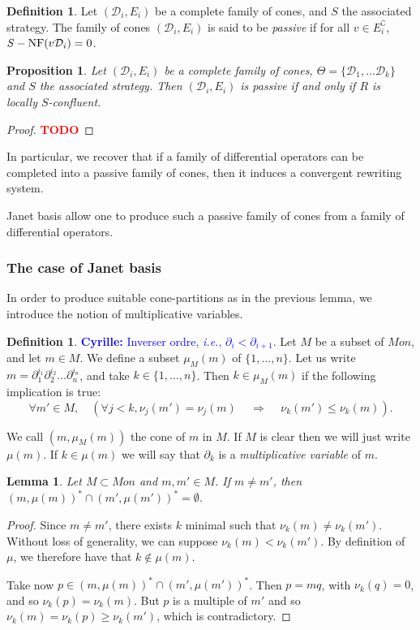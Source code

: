 \documentclass[10pt]{easychair}
\newtheorem{lemma}[theorem]{Lemma}
\newtheorem{proposition}[theorem]{Proposition}
\theoremstyle{definition}
\newtheorem{definition}[theorem]{Definition}
\newcommand\ie{\emph{i.e.}}
\newcommand\todo[1]{{\bf\textcolor{red}{#1}}}
\newcommand\fixmecc[1]{{\textcolor{blue}{{\bf Cyrille:} #1}}}
\newcommand\D{\mathcal{D}}
\DeclareMathOperator{\SNF}{{\it S}-NF}
\begin{document}
 
\begin{definition}
  Let $(\D_i,E_i)$ be a complete family of cones, and $S$ the associated strategy.
  The family of cones $(\D_i,E_i)$ is said to be \emph{passive} if for all
  $v \in E_i^\complement$, $\SNF(v\D_i) = 0$.
\end{definition}

\begin{proposition}
  Let $(\D_i,E_i)$ be a complete family of cones,
  $\Theta = \{\D_1,\ldots \D_k\} $ and $S$ the associated strategy.
  Then $(\D_i,E_i)$ is passive if and only if $R$ is locally $S$-confluent.
\end{proposition}
\begin{proof}
\todo{TODO} 
\end{proof}

In particular, we recover that if a family of differential operators can be
completed into a passive family of cones,
then it induces a convergent rewriting system.

Janet basis allow one to produce such a passive family of cones from a
family of differential operators.

\subsubsection{The case of Janet basis}

In order to produce suitable cone-partitions as in the previous lemma,
we introduce the notion of multiplicative variables.

\begin{definition}
  \fixmecc{Inverser ordre, \ie, $\partial_i<\partial_{i+1}$.}
  Let $M$ be a subset of $Mon$, and let $m  \in M$. We define a subset $\mu_M(m)$
  of $\{1,\ldots,n\}$. Let us write $m = \partial_1^{i_1}\partial_2^{i_2}\ldots \partial_n^{i_n}$, and take
  $k \in \{1,\ldots,n\}$. Then $k \in \mu_M(m)$ if the following implication is true:
  \[
\forall m' \in M, \quad (\forall j < k, \nu_j(m') = \nu_j(m) \, \quad \Rightarrow \quad \, \nu_k(m') \leq \nu_k(m)).
  \]
  

  We call $(m,\mu_M(m))$ the cone of $m$ in $M$. If $M$ is clear then we will
  just write $\mu(m)$. If $k \in \mu(m)$ we will say that $\partial_k$ is a
  \emph{multiplicative variable} of $m$.
\end{definition}

\begin{lemma}\label{lem:multiplicative_cones_disjoint}
Let $M \subset Mon$ and $m,m' \in M$. If $m \neq m'$, then $(m,\mu(m))^* \cap (m',\mu(m'))^* = \emptyset$.
\end{lemma}
\begin{proof}
  Since $m \neq m'$, there exists $k$ minimal such that $\nu_k(m) \neq \nu_k(m')$.
  Without loss of generality, we can suppose $\nu_k(m) < \nu_k(m')$.
  By definition of $\mu$, we therefore have that $k \notin \mu(m)$.

  Take now $p \in (m,\mu(m))^* \cap (m',\mu(m'))^*$. Then $p = mq$, with $\nu_k(q) = 0$,
  and so $\nu_k(p) = \nu_k(m)$. But $p$ is a multiple of $m'$ and so
  $\nu_k(m) = \nu_k(p) \geq \nu_k(m')$, which is contradictory.
 \end{proof}
\end{document}
